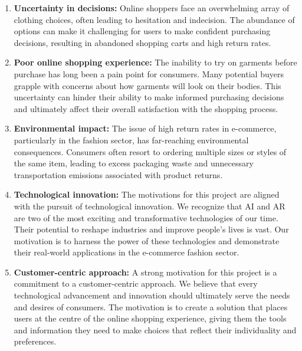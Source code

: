 	\begin{enumerate}
		\item \textbf{Uncertainty in decisions:} Online shoppers face an overwhelming array of clothing choices, often leading to hesitation and indecision. The abundance of options can make it challenging for users to make confident purchasing decisions, resulting in abandoned shopping carts and high return rates.
		\item \textbf{Poor online shopping experience:} The inability to try on garments before purchase has long been a pain point for consumers. Many potential buyers grapple with concerns about how garments will look on their bodies. This uncertainty can hinder their ability to make informed purchasing decisions and ultimately affect their overall satisfaction with the shopping process.
		\item \textbf{Environmental impact:} The issue of high return rates in e-commerce, particularly in the fashion sector, has far-reaching environmental consequences. Consumers often resort to ordering multiple sizes or styles of the same item, leading to excess packaging waste and unnecessary transportation emissions associated with product returns.
		\item \textbf{Technological innovation:} The motivations for this project are aligned with the pursuit of technological innovation. We recognize that AI and AR are two of the most exciting and transformative technologies of our time. Their potential to reshape industries and improve people's lives is vast. Our motivation is to harness the power of these technologies and demonstrate their real-world applications in the e-commerce fashion sector.
		\item \textbf{Customer-centric approach:} A strong motivation for this project is a commitment to a customer-centric approach. We believe that every technological advancement and innovation should ultimately serve the needs and desires of consumers. The motivation is to create a solution that places users at the centre of the online shopping experience, giving them the tools and information they need to make choices that reflect their individuality and preferences.
	\end{enumerate}